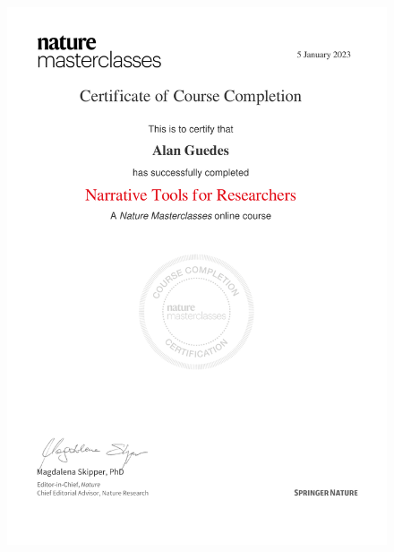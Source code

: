 \documentclass[10pt,a4paper,sans,colorlinks]{moderncv}
\begin{document}
\begin{figure}
    \includegraphics[align=t,width=\textwidth,height=0.45\textheight, keepaspectratio=true]{certificates/Narrative_Tools_for_Researchers.pdf}
\end{figure}
\end{document}
